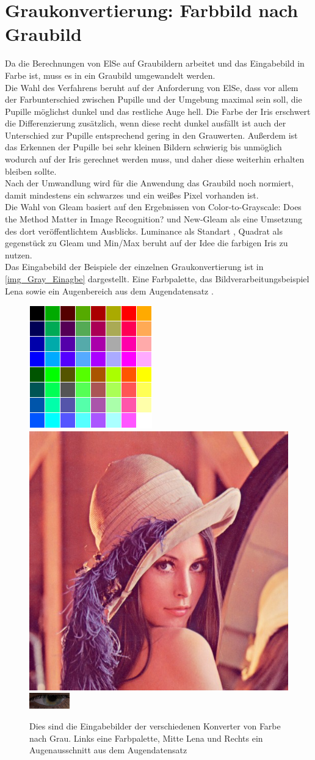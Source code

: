 \section{Graukonvertierung: Farbbild nach Graubild}
\label{Graubild}
Da die Berechnungen von ElSe auf Graubildern arbeitet und das Eingabebild in Farbe ist, muss es in ein Graubild umgewandelt werden.\\
Die Wahl des Verfahrens beruht auf der Anforderung von ElSe, dass vor allem der Farbunterschied zwischen Pupille und der Umgebung maximal sein soll, die Pupille möglichst dunkel und das restliche Auge hell. Die Farbe der Iris erschwert die Differenzierung zusätzlich, wenn diese recht dunkel ausfällt ist auch der Unterschied zur Pupille entsprechend gering in den Grauwerten. Außerdem ist das Erkennen der Pupille bei sehr kleinen Bildern schwierig bis unmöglich wodurch auf der Iris gerechnet werden muss, und daher diese weiterhin erhalten bleiben sollte.\\
Nach der Umwandlung wird für die Anwendung das Graubild noch normiert, damit mindestens ein schwarzes und ein weißes Pixel vorhanden ist.\\
Die Wahl von Gleam basiert auf den Ergebnissen von \glqq Color-to-Grayscale: Does the Method Matter in Image Recognition?\grqq \cite{rgb_to_Gray} und New-Gleam als eine Umsetzung des dort veröffentlichtem Ausblicks. Luminance als Standart , Quadrat als gegenstück zu Gleam und Min/Max beruht auf der Idee die farbigen Iris zu nutzen.\\
Das Eingabebild der Beispiele der einzelnen Graukonvertierung ist in \autoref{img_Gray_Einagbe} dargestellt. Eine Farbpalette, das Bildverarbeitungsbeispiel Lena sowie ein Augenbereich aus dem Augendatensatz \cite{database_Eye}. 
\begin{figure}
	\centering
	\includegraphics[width=0.2\linewidth]{img/Farbtafel2}
	\includegraphics[width=0.2\linewidth]{img/lena}
	\includegraphics[width=0.2\linewidth]{img/Auge}
	\caption{Dies sind die Eingabebilder der verschiedenen Konverter von Farbe nach Grau. Links eine Farbpalette, Mitte Lena und Rechts ein Augenausschnitt aus dem Augendatensatz \cite{database_Eye}}
	\label{img_Gray_Einagbe}
\end{figure}
